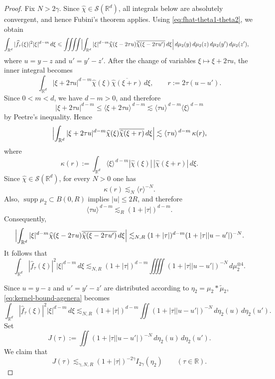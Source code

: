 \documentclass[10pt,a4paper]{amsart}
\newcommand{\Rd}{\mathbb{R}^d}
\newcommand{\R}{\mathbb{R}}
\newcommand{\ang}[1]{\langle #1\rangle}
\newcommand{\spt}{\operatorname{supp}}
\renewcommand{\le}{\leqslant}
\begin{document}
\begin{proof}
Fix $N>2\gamma$. Since $\widehat\chi\in\mathcal S(\Rd)$, all integrals below are
absolutely convergent, and hence Fubini's theorem applies. Using
\eqref{eq:fhat-theta1-theta2}, we obtain
\begin{align*}
\int_{\Rd}|\widehat f_{\tau}(\xi)|^2|\xi|^{d-m}\,d\xi
&\le
\iiiint
\Bigl|
\int_{\Rd}
|\xi|^{d-m}\widehat\chi(\xi-2\tau u)
\overline{\widehat\chi(\xi-2\tau u')}
\,d\xi
\Bigr|
\,d\mu_2(y)\,d\mu_2(z)\,d\mu_2(y')\,d\mu_2(z'),
\end{align*}
where $u=y-z$ and $u'=y'-z'$. After the change of variables
$\xi\mapsto \xi+2\tau u$, the inner integral becomes
\[
\int_{\Rd} |\xi+2\tau u|^{d-m}\widehat\chi(\xi)
\overline{\widehat\chi(\xi+r)}\,d\xi,
\qquad r:=2\tau(u-u').
\]
Since $0<m<d$, we have $d-m>0$, and therefore
\[
|\xi+2\tau u|^{d-m}
\le
\ang{\xi+2\tau u}^{\,d-m}
\lesssim
\ang{\tau u}^{\,d-m}\ang{\xi}^{\,d-m}
\]
by Peetre's inequality. Hence
\[
\Bigl|
\int_{\Rd} |\xi+2\tau u|^{d-m}\widehat\chi(\xi)
\overline{\widehat\chi(\xi+r)}\,d\xi
\Bigr|
\lesssim
\ang{\tau u}^{\,d-m}\,\kappa(r),
\]
where
\[
\kappa(r):=
\int_{\Rd}\ang{\xi}^{\,d-m}|\widehat\chi(\xi)|\,|\widehat\chi(\xi+r)|\,d\xi.
\]
Since $\widehat\chi\in\mathcal S(\Rd)$, for every $N>0$ one has
\[
\kappa(r)\lesssim_N \ang{r}^{-N}.
\]
Also, $\spt\mu_2\subset B(0,R)$ implies $|u|\le 2R$, and therefore
\[
\ang{\tau u}^{\,d-m}\lesssim_R (1+|\tau|)^{d-m}.
\]
Consequently,
\[
\Bigl|
\int_{\Rd}
|\xi|^{d-m}\widehat\chi(\xi-2\tau u)
\overline{\widehat\chi(\xi-2\tau u')}\,d\xi
\Bigr|
\lesssim_{N,R}
(1+|\tau|)^{d-m}(1+|\tau||u-u'|)^{-N}.
\]
It follows that
\begin{equation}\label{eq:kernel-bound-agenera}
\int_{\Rd}|\widehat f_{\tau}(\xi)|^2|\xi|^{d-m}\,d\xi
\lesssim_{N,R}
(1+|\tau|)^{d-m}
\iiiint (1+|\tau||u-u'|)^{-N}\,d\mu_2^{\otimes 4}.
\end{equation}

Since $u=y-z$ and $u'=y'-z'$ are distributed according to
$\eta_2=\mu_2*\widetilde\mu_2$, \eqref{eq:kernel-bound-agenera} becomes
\[
\int_{\Rd}|\widehat f_{\tau}(\xi)|^2|\xi|^{d-m}\,d\xi
\lesssim_{N,R}
(1+|\tau|)^{d-m}
\iint (1+|\tau||u-u'|)^{-N}\,d\eta_2(u)\,d\eta_2(u').
\]
Set
\[
J(\tau):=
\iint (1+|\tau||u-u'|)^{-N}\,d\eta_2(u)\,d\eta_2(u').
\]
We claim that
\begin{equation}\label{eq:kernel-to-energy-agenera}
J(\tau)\lesssim_{\gamma,N,R}(1+|\tau|)^{-2\gamma}I_{2\gamma}(\eta_2)
\qquad (\tau\in\R).
\end{equation}


\end{proof}
\end{document}
